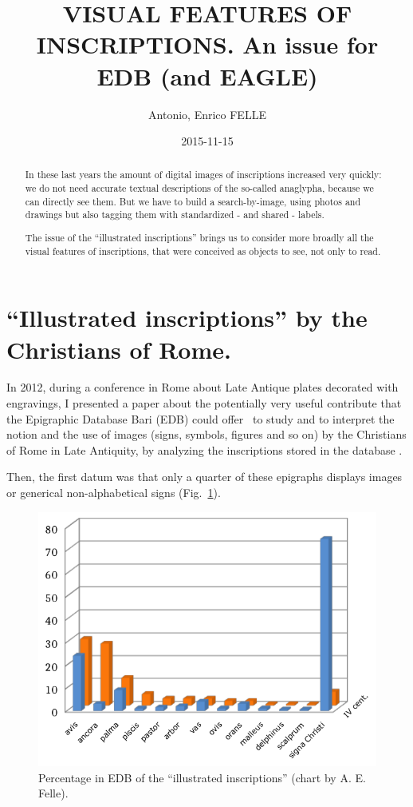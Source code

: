 \documentclass[amsthm,ebook]{saparticle}
\title{VISUAL FEATURES OF INSCRIPTIONS. An issue for EDB (and EAGLE)}
\author[uniba]{Antonio, Enrico FELLE\corref{first}}
\date{2015-11-15}
\begin{document}
\maketitle
\begin{abstract}
In these last years the amount of digital images of inscriptions increased very quickly: we do not need accurate textual
descriptions of the so-called anaglypha, because we can directly see them. But we have to build a search-by-image,
using photos and drawings but also tagging them with standardized - and shared - labels. 

The issue of the ``illustrated inscriptions'' brings us to consider more broadly all the
visual features of inscriptions, that were conceived as objects to see, not only to read.
\end{abstract}




\section{``Illustrated inscriptions'' by the Christians of Rome.}
In 2012, during a conference in Rome about Late Antique plates decorated with engravings, I presented a paper about the
potentially very useful contribute that the Epigraphic Database Bari (EDB) could offer \ to study and to interpret the
notion and the use of images (signs, symbols, figures and so on) by the Christians of Rome in Late Antiquity, by
analyzing the inscriptions stored in the database \citep{felle_apporto_2013}. 

Then, the first datum was that only a quarter of these epigraphs displays images or generical non-alphabetical signs
\citep[101]{felle_apporto_2013} (Fig.~\ref{fig:1}).

\begin{figure}[!bp]
\centering
 \includegraphics[width=\columnwidth]{FelleVisualFeaturesofinscriptionsEAGLE2016FullPaper-img001.pdf}
\caption{Percentage in EDB of the ``illustrated inscriptions'' (chart by A. E. Felle).}
\label{fig:1}
\end{figure}
\end{document}
